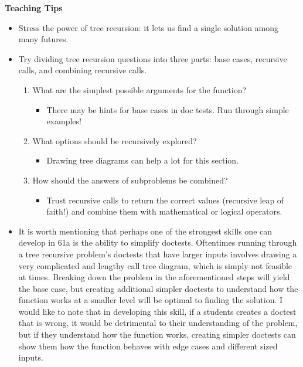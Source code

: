 \begin{meta}
\textbf{Teaching Tips}
\begin{itemize}
    \item Stress the power of tree recursion: it lets us find a single solution among many futures.
    \item Try dividing tree recursion questions into three parts: base cases, recursive calls, and combining recursive calls.
    \begin{enumerate}
        \item What are the simplest possible arguments for the function?
        \begin{itemize}
            \item There may be hints for base cases in doc tests. Run through simple examples!
        \end{itemize}
        \item What options should be recursively explored?
        \begin{itemize}
            \item Drawing tree diagrams can help a lot for this section.
        \end{itemize}
        \item How should the answers of subproblems be combined?
        \begin{itemize}
            \item Trust recursive calls to return the correct values (recursive leap of faith!) and combine them with mathematical or logical operators.
        \end{itemize}
    \end{enumerate}
    \item It is worth mentioning that perhaps one of the strongest skills one can develop in 61a is the ability to simplify doctests.
          Oftentimes running through a tree recursive problem's doctests that have larger inputs involves drawing a very complicated and lengthy call tree diagram,
          which is simply not feasible at times. Breaking down the problem in the aforementioned steps will yield the base case, but creating additional simpler doctests 
          to understand how the function works at a smaller level will be optimal to finding the solution. I would like to note that in developing this skill, if a students
          creates a doctest that is wrong, it would be detrimental to their understanding of the problem, but if they understand how the function works, creating simpler doctests
          can show them how the function behaves with edge cases and different sized inputs.

\end{itemize}
\end{meta}
